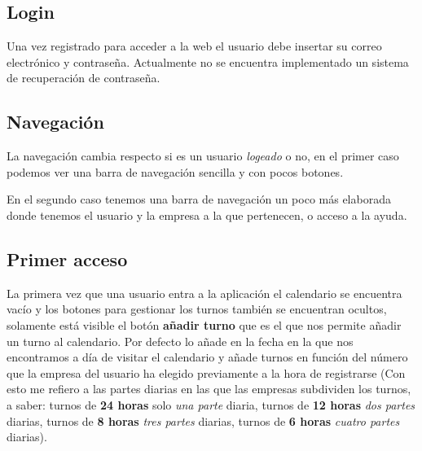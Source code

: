 \subsection{Login}

Una vez registrado para acceder a la web el usuario debe insertar su correo electrónico y contraseña. Actualmente no se encuentra implementado un sistema de recuperación de contraseña.


\subsection{Navegación}

La navegación cambia respecto si es un usuario \emph{logeado} o no, en el primer caso podemos ver una barra de navegación sencilla y con pocos botones.


En el segundo caso tenemos una barra de navegación un poco más elaborada donde tenemos el usuario y la empresa a la que pertenecen, o acceso a la ayuda.




\subsection{Primer acceso}
La primera vez que una usuario entra a la aplicación el calendario se encuentra vacío y los botones para gestionar los turnos también se encuentran ocultos, solamente está visible el botón \textbf{añadir turno} que es el que nos permite añadir un turno al calendario. Por defecto lo añade en la fecha en la que nos encontramos a día de visitar el calendario y añade turnos en función del número que la empresa del usuario ha elegido previamente a la hora de registrarse (Con esto me refiero a las partes diarias en las que las empresas subdividen los turnos, a saber: turnos de \textbf{ 24 horas} solo \emph{una parte} diaria, turnos de \textbf{12 horas} \emph{dos partes} diarias, turnos de \textbf{8 horas} \emph{tres partes} diarias, turnos de \textbf{6 horas} \emph{cuatro partes} diarias).



